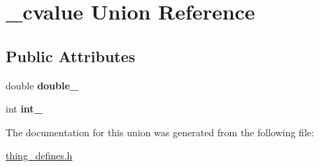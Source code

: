 \hypertarget{union__cvalue}{\section{\-\_\-cvalue Union Reference}
\label{union__cvalue}
}
\subsection*{Public Attributes}
\begin{DoxyCompactItemize}
\item 
\hypertarget{union__cvalue_aa314ceeb89f39b472259ae4c6d8a084e}{double {\bfseries double\-\_\-}}\label{union__cvalue_aa314ceeb89f39b472259ae4c6d8a084e}

\item 
\hypertarget{union__cvalue_a9e76d8e55278ba6c505ff6426458aa0e}{int {\bfseries int\-\_\-}}\label{union__cvalue_a9e76d8e55278ba6c505ff6426458aa0e}

\end{DoxyCompactItemize}


The documentation for this union was generated from the following file\-:\begin{DoxyCompactItemize}
\item 
\hyperlink{thing__defines_8h}{thing\-\_\-defines.\-h}\end{DoxyCompactItemize}
